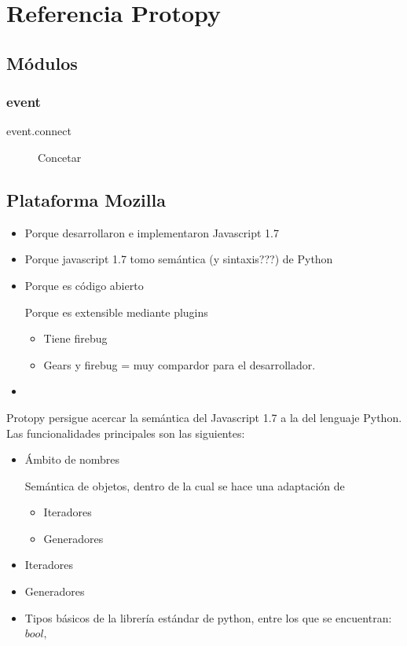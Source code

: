 \documentclass[a4paper]{report}
\begin{document}
\chapter{Referencia Protopy}

\section{Módulos}
\subsection{event}
\begin{description}
\item[event.connect]{Concetar}
\end{description}
\section{Plataforma Mozilla}
\begin{itemize}
  \item Porque desarrollaron e implementaron Javascript 1.7
  \item Porque javascript 1.7 tomo semántica (y sintaxis???) de Python
  \item Porque es código abierto
  \begin{item}
  	Porque es extensible mediante plugins
  	\begin{itemize}
        \item Tiene firebug
        \item Gears y firebug = muy compardor para el desarrollador.
     \end{itemize}
      
  \end{item}
  \item 
\end{itemize}




\label{ch:protopy}

Protopy persigue acercar la semántica del Javascript 1.7 a la del lenguaje
Python. Las funcionalidades principales son las siguientes:
\begin{itemize}
  \item Ámbito de nombres
  \begin{item}
  Semántica de objetos, dentro de la cual se hace una adaptación de
  \begin{itemize}
  	\item Iteradores
  	\item Generadores  
  \end{itemize}
  \end{item}
  
  
  \item Iteradores
  \item Generadores
  
  \item Tipos básicos de la librería estándar de python, entre los que se
  encuentran: $ bool, $
\end{itemize}
\end{document}
